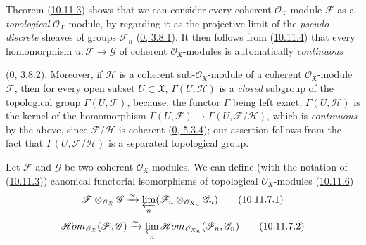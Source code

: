\begin{env}[10.11.6]
\label{I.10.11.6}
Theorem (\hyperref[I.10.11.3]{10.11.3}) shows that we can consider
every coherent $\mathscr{O}_{\mathfrak{X}}$-module $\mathscr{F}$ as
a \emph{topological} $\mathscr{O}_{\mathfrak{X}}$-module, by
regarding it as the projective limit of the \emph{pseudo-discrete}
sheaves of groups $\mathscr{F}_n$
(\hyperref[0.3.8.1]{0, 3.8.1}). It then follows from
(\hyperref[I.10.11.4]{10.11.4}) that every homomorphism
$u:\mathscr{F}\to\mathscr{G}$ of
coherent $\mathscr{O}_{\mathfrak{X}}$-modules is automatically
\emph{continuous}


(\hyperref[0.3.8.2]{0, 3.8.2}). Moreover, if $\mathscr{H}$ is a
coherent sub-$\mathscr{O}_{\mathfrak{X}}$-module of a
coherent $\mathscr{O}_{\mathfrak{X}}$-module $\mathscr{F}$, then for every
open subset $U\subset\mathfrak{X}$, $\Gamma(U,\mathscr{H})$ is a \emph{closed}
subgroup of the topological group $\Gamma(U,\mathscr{F})$, because, the functor
$\Gamma$ being left exact, $\Gamma(U,\mathscr{H})$ is the kernel of
the homomorphism
$\Gamma(U,\mathscr{F})\to\Gamma(U,\mathscr{F}/\mathscr{H})$, which is
\emph{continuous} by the above, since $\mathscr{F}/\mathscr{H}$
is coherent (\hyperref[0.5.3.4]{0, 5.3.4}); our assertion follows
from the fact that $\Gamma(U,\mathscr{F}/\mathscr{H})$ is a separated
topological group.
\end{env}

\begin{proposition}[10.11.7]
\label{I.10.11.7}
Let $\mathscr{F}$ and $\mathscr{G}$ be two coherent
$\mathscr{O}_{\mathfrak{X}}$-modules. We can define (with the
notation of (\hyperref[I.10.11.3]{10.11.3})) canonical functorial
isomorphisms of topological $\mathscr{O}_{\mathfrak{X}}$-modules
(\hyperref[I.10.11.6]{10.11.6})
\[
  \label{I.10.11.7.1}
  \mathscr{F}\otimes_{\mathscr{O}_{\mathfrak{X}}}\mathscr{G}
  \xrightarrow{\sim}
  \varprojlim_n
  (\mathscr{F}_n\otimes_{\mathscr{O}_{X_n}}\mathscr{G}_n)
  \tag{10.11.7.1}
\]
\[
  \label{I.10.11.7.2}
  \mathscr{H}\!om_{\mathscr{O}_{\mathfrak{X}}}
  (\mathscr{F},\mathscr{G})
  \xrightarrow{\sim}
  \varprojlim_n
  \mathscr{H}\!om_{\mathscr{O}_{X_n}}(\mathscr{F}_n,\mathscr{G}_n)
  \tag{10.11.7.2}
\]
\end{proposition}

